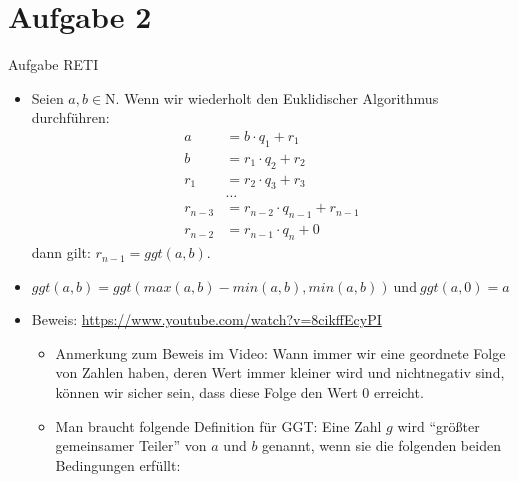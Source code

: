 
\section{Aufgabe 2}

\setcounter{exercise}{1}

\begin{frame}{Aufgabe \thesection}{RETI}
    \begin{requirementsnoinc}
      \begin{itemize}
        \item Seien $a, b\in \mathrm{N}$. Wenn wir wiederholt den \alert{Euklidischer Algorithmus} durchführen:
        \begin{align*}
          a &= b\cdot q_1 + r_1\\
          b &= r_1\cdot q_2 + r_2\\
          r_1 &= r_2\cdot q_3 + r_3\\
              &\ldots\\
          r_{n-3} &= r_{n-2}\cdot q_{n-1} + r_{n-1}\\
          r_{n-2} &= r_{n-1}\cdot q_{n} + 0
        \end{align*}
        dann gilt: $r_{n-1} = ggt(a, b)$.
        \item $g g t(a,b)=g g t(m a x(a,b)-m i n(a,b),m i n(a,b)){\mathrm{~und~}}g g t(a,0)=a$
      \end{itemize}
    \end{requirementsnoinc}  
    \begin{requirementsnoinc}
      \begin{itemize}
        \item \alert{Beweis:} \url{https://www.youtube.com/watch?v=8cikffEcyPI}
        \begin{itemize}
          \item \alert{Anmerkung zum Beweis im Video:} Wann immer wir eine geordnete Folge von Zahlen haben, deren Wert immer kleiner wird und nichtnegativ sind, können wir sicher sein, dass diese Folge den Wert $0$ erreicht.
          \item \alert{Man braucht folgende Definition für GGT:} Eine Zahl $g$ wird \enquote{größter gemeinsamer Teiler} von $a$ und $b$ genannt, wenn sie die folgenden beiden Bedingungen erfüllt:
          \begin{enumerate}

\end{enumerate}
\end{itemize}
\end{itemize}
\end{requirementsnoinc}
\end{frame}
